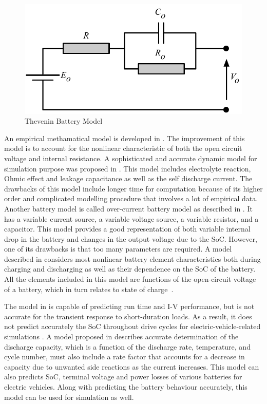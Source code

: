 \begin{figure}[b]
\centering
\includegraphics[scale=0.5]{Figures/Zili_Shao/ZS_figure1.pdf}
\caption{Thevenin Battery Model}

\end{figure}

An empirical methamatical model is developed in \cite{ZS_jayne,ZS_sims}. The improvement of this model is to account for the nonlinear
characteristic of both the open circuit voltage and
internal resistance. A sophisticated and accurate dynamic model for simulation purpose was proposed in \cite{ZS_gig}. This model includes electrolyte reaction, Ohmic effect and leakage capacitance as well as the self discharge current. The drawbacks of this model include longer time for computation because of its higher order and complicated modelling procedure that involves a lot of empirical data. Another battery model is called over-current battery model as described in \cite{ZS_rob}. It has a variable
current source, a variable voltage source, a variable resistor, and a capacitor. 
This model provides a good representation of both variable
internal drop in the battery and changes in the output voltage
due to the SoC. However, one of its drawbacks is
that too many parameters are required. A model described in \cite{ZS_zi,ZS_mar}
considers most nonlinear battery element characteristics both during charging and 
discharging as well as their dependence on the SoC of the battery. All the elements included in this model are functions of the
open-circuit voltage of a battery, which in turn relates to state of
charge~\cite{ZS_chan}.


The model in \cite{ZS_chen} is capable of predicting run time and I-V performance, but is not
accurate for the transient response to short-duration loads. As a result, it does not predict accurately
the SoC throughout drive cycles for electric-vehicle-related simulations \cite{ZS_kro}. A model proposed in \cite{ZS_kro} describes accurate determination of the discharge capacity, which is a function of the discharge rate, temperature, and cycle number, must also include a rate factor that accounts
for a decrease in capacity due to unwanted side reactions
 as the current increases. This model can also predicts SoC, terminal voltage and power losses of various batteries for electric vehicles. Along with predicting the battery behaviour accurately, this model can be used for simulation as well. 
 
